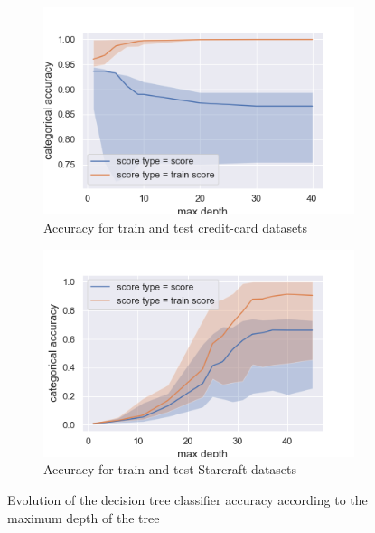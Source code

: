\documentclass[twocolumn, a4paper, 10pt]{article}
\begin{document}
		\begin{figure}[]
			\centering
			\begin{subfigure}[]{0.8\columnwidth}
				\centering
				\includegraphics[width=\linewidth]{../graphics/tree_creditcard_max_depth_score_type_score_type.png}
				\caption{Accuracy for train and test credit-card datasets}
				\label{tree:cc_train_vs_test}
			\end{subfigure}
			\begin{subfigure}[]{0.8\columnwidth}
				\centering
				\includegraphics[width=\linewidth]{../graphics/tree_starcraft_max_depth_score_type_score_type.png}
				\caption{Accuracy for train and test Starcraft datasets}
				\label{tree:sc_train_vs_test}
			\end{subfigure}
			\caption{Evolution of the decision tree classifier accuracy according to the maximum depth of the tree}
			\label{tree:train_vs_test}
		\end{figure}
\end{document}
